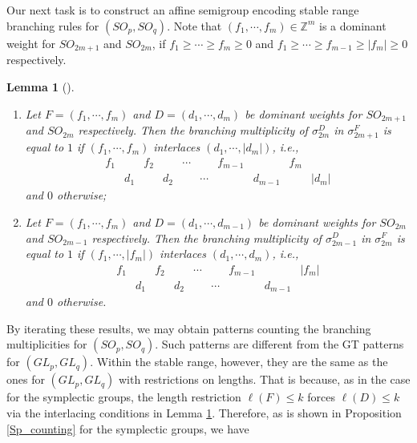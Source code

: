 \documentclass[11pt]{amsart}
\numberwithin{equation}{subsection}
\newtheorem{lemma}[theorem]{Lemma}
\begin{document}
\subsection{}

Our next task is to construct an affine semigroup encoding stable range
branching rules for $({SO}_{p},{SO}_{q})$. Note that $(f_1, \cdots, f_m)  \in \mathbb{Z}^m$ 
is a dominant weight for $SO_{2m+1}$ and $SO_{2m}$, if $f_1 \geq \cdots \geq f_m \geq 0$ 
and $f_1 \geq \cdots \geq f_{m-1} \geq |f_m| \geq 0$ respectively.

\begin{lemma}[{\protect\cite[Theorems 8.1.3 and 8.1.4]{GW09}}]
\label{SO_branching}
\begin{enumerate}
\item  Let $F=(f_1, \cdots, f_m)$ and $D=(d_1, \cdots, d_m)$ be dominant weights for 
$SO_{2m+1}$ and $SO_{2m}$ respectively. Then the branching multiplicity of $\sigma _{2m}^{D}$ 
in $\sigma _{2m+1}^{F}$ is equal to $1$ if $(f_1, \cdots, f_m)$ interlaces 
$(d_1, \cdots, |d_m|)$, i.e.,
\begin{equation*}
\begin{array}{cccccccccc}
f_{1} &  & f_{2} &  & \cdots &  & f_{m-1} & & f_{m} &    \\ 
& d_{1} &  & d_{2} &  & \cdots &  & d_{m-1} & & |d_{m}|   
\end{array}\end{equation*}
and $0$ otherwise;

\item  Let $F=(f_1, \cdots, f_m)$ and $D=(d_1, \cdots, d_{m-1})$ be dominant weights for 
$SO_{2m}$ and $SO_{2m-1}$ respectively. Then the branching multiplicity of 
$\sigma _{2m-1}^{D}$ in $\sigma _{2m}^{F}$ is equal to $1$ if $(f_1, \cdots, |f_m|)$ 
interlaces $(d_1, \cdots, d_m)$, i.e.,
\begin{equation*}
\begin{array}{ccccccccc}
f_{1} &  & f_{2} &  & \cdots &  & f_{m-1} & &|f_{m}| \\ 
& d_{1} &  & d_{2} &  & \cdots &  & d_{m-1}   &
\end{array}\end{equation*}
and $0$ otherwise.
\end{enumerate}
\end{lemma}

By iterating these results, we may obtain patterns counting the branching multiplicities 
for $(SO_p, SO_q)$. Such patterns are different from the GT patterns for $(GL_p, GL_q)$. 
Within the stable range, however, they are the same as the ones for $(GL_p, GL_q)$ with 
restrictions on lengths.
That is because, as in the case for the symplectic groups, the length restriction 
$\ell(F) \leq k$ forces $\ell(D) \leq k$ via the interlacing conditions in 
Lemma \ref{SO_branching}. Therefore, as is shown in Proposition \ref{Sp_counting} for 
the symplectic groups, we have
\end{document}
